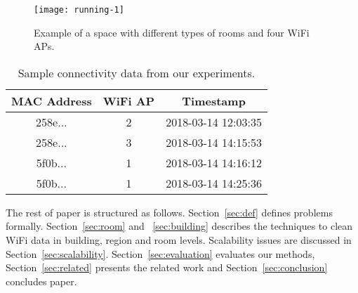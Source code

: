 \begin{figure}[!htb]
	\centering
	\vspace{-0.8em}
	\texttt{[image: running-1]}
	\caption{Example of a space with different types of rooms and four WiFi APs.}
	\label{fig:running}
\end{figure}

\begin{table}[!htb]
	\centering
	\caption{Sample connectivity data from our experiments.}
	\label{tab:connectivity}
	\label{tab:wifi}
	\begin{tabular}{|c|c|c|}
		\hline
		MAC Address & WiFi AP & Timestamp \\ \hline
		258e... & 2 & 2018-03-14 12:03:35  \\ \hline
		258e... & 3 & 2018-03-14 14:15:53 \\ \hline
		5f0b... & 1 & 2018-03-14 14:16:12 \\ \hline
		5f0b... & 1 & 2018-03-14 14:25:36 \\ \hline
	\end{tabular}
	\vspace{-0.5em}
\end{table} 

The rest of paper is structured as follows. Section~\ref{sec:def} defines problems formally. Section~\ref{sec:room} and ~\ref{sec:building} describes the techniques to clean WiFi data in building, region and room levels. Scalability issues are discussed in Section~\ref{sec:scalability}. Section~\ref{sec:evaluation} evaluates our methods, Section~\ref{sec:related} presents the related work and Section~\ref{sec:conclusion} concludes paper. 